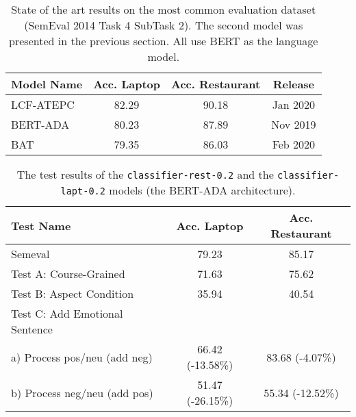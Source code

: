 \begin{table}[h]
\renewcommand\thetable{1}   %
\captionsetup{font=footnotesize}  %
\vspace*{10pt}
\centering

\begin{tabular}{l c c c}
\toprule
Model Name & Acc. Laptop & Acc. Restaurant & Release \\
\midrule
LCF-ATEPC & 82.29 & 90.18 & Jan 2020 \\
BERT-ADA & 80.23 & 87.89 & Nov 2019 \\
BAT & 79.35 & 86.03 & Feb 2020 \\
\bottomrule
\end{tabular}

\caption{
State of the art results on the most common evaluation dataset (SemEval 2014 Task 4 SubTask 2).
The second model was presented in the previous section. All use BERT as the language model.
}
\label{tab:semeval}
\end{table}



\begin{table}[h]
\renewcommand\thetable{2}
\captionsetup{font=footnotesize}
\vspace*{10pt}
\centering

\begin{tabular}{l c c}
\toprule
Test Name & Acc. Laptop & Acc. Restaurant \\
\midrule
Semeval & 79.23 & 85.17 \\
\midrule
Test A: Course-Grained   & 71.63 & 75.62 \\
Test B: Aspect Condition & 35.94 & 40.54 \\
Test C: Add Emotional Sentence  & & \\
\quad \qquad \: a) Process pos/neu (add neg) & 66.42 (-13.58\%) & 83.68 (-4.07\%)  \\
\quad \qquad \: b) Process neg/neu (add pos) & 51.47 (-26.15\%) & 55.34 (-12.52\%) \\
\bottomrule
\end{tabular}

\caption{
The test results of the \texttt{classifier-rest-0.2}
and the \texttt{classifier-lapt-0.2} models (the BERT-ADA architecture).
}
\label{tab:model-tests}
\end{table}



